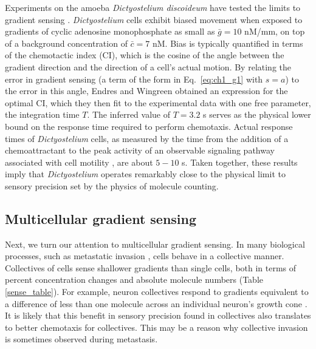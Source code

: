 Experiments on the amoeba \textit{Dictyostelium discoideum} have tested the limits to gradient sensing \cite{van2007biased}. \textit{Dictyostelium} cells exhibit biased movement when exposed to gradients of cyclic adenosine monophosphate as small as $\bar{g} = 10$ nM/mm, on top of a background concentration of $\bar{c} = 7$ nM. Bias is typically quantified in terms of the chemotactic index (CI), which is the cosine of the angle between the gradient direction and the direction of a cell's actual motion. By relating the error in gradient sensing (a term of the form in Eq.\ \ref{eq:ch1_g1} with $s = a$) to the error in this angle, Endres and Wingreen \cite{endres2008accuracy} obtained an expression for the optimal CI, which they then fit to the experimental data with one free parameter, the integration time $T$.
The inferred value of $T = 3.2$ s serves as the physical lower bound on the response time required to perform chemotaxis. Actual response times of \textit{Dictyostelium} cells, as measured by the time from the addition of a chemoattractant to the peak activity of an observable signaling pathway associated with cell motility \cite{postma2003uniform, parent2004making}, are about $5-10$ s. Taken together, these results imply that \textit{Dictyostelium} operates remarkably close to the physical limit to sensory precision set by the physics of molecule counting.


\subsection{Multicellular gradient sensing}

Next, we turn our attention to multicellular gradient sensing. In many biological processes, such as metastatic invasion \cite{cheung2013collective, friedl2012classifying}, cells behave in a collective manner. Collectives of cells sense shallower gradients than single cells, both in terms of percent concentration changes and absolute molecule numbers (Table \ref{sense_table}). For example, neuron collectives respond to gradients equivalent to a difference of less than one molecule across an individual neuron's growth cone \cite{rosoff2004new}. It is likely that this benefit in sensory precision found in collectives also translates to better chemotaxis for collectives. This may be a reason why collective invasion is sometimes observed during metastasis.

